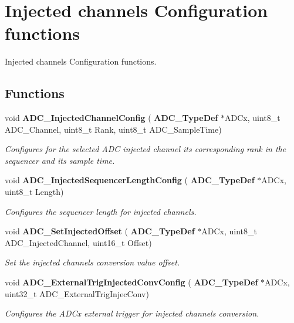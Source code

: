 \section{Injected channels Configuration functions}
\label{group__ADC__Group6}


Injected channels Configuration functions.  


\subsection*{Functions}
\begin{DoxyCompactItemize}
\item 
void \textbf{ A\+D\+C\+\_\+\+Injected\+Channel\+Config} (\textbf{ A\+D\+C\+\_\+\+Type\+Def} $\ast$A\+D\+Cx, uint8\+\_\+t A\+D\+C\+\_\+\+Channel, uint8\+\_\+t Rank, uint8\+\_\+t A\+D\+C\+\_\+\+Sample\+Time)
\begin{DoxyCompactList}\small\item\em Configures for the selected A\+DC injected channel its corresponding rank in the sequencer and its sample time. \end{DoxyCompactList}\item 
void \textbf{ A\+D\+C\+\_\+\+Injected\+Sequencer\+Length\+Config} (\textbf{ A\+D\+C\+\_\+\+Type\+Def} $\ast$A\+D\+Cx, uint8\+\_\+t Length)
\begin{DoxyCompactList}\small\item\em Configures the sequencer length for injected channels. \end{DoxyCompactList}\item 
void \textbf{ A\+D\+C\+\_\+\+Set\+Injected\+Offset} (\textbf{ A\+D\+C\+\_\+\+Type\+Def} $\ast$A\+D\+Cx, uint8\+\_\+t A\+D\+C\+\_\+\+Injected\+Channel, uint16\+\_\+t Offset)
\begin{DoxyCompactList}\small\item\em Set the injected channels conversion value offset. \end{DoxyCompactList}\item 
void \textbf{ A\+D\+C\+\_\+\+External\+Trig\+Injected\+Conv\+Config} (\textbf{ A\+D\+C\+\_\+\+Type\+Def} $\ast$A\+D\+Cx, uint32\+\_\+t A\+D\+C\+\_\+\+External\+Trig\+Injec\+Conv)
\begin{DoxyCompactList}\small\item\em Configures the A\+D\+Cx external trigger for injected channels conversion. \end{DoxyCompactList}\item 

\end{DoxyCompactItemize}
